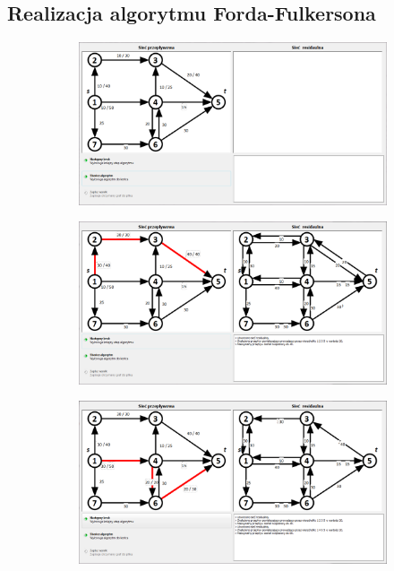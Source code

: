 \begin{appendices}
 	\chapter{Realizacja algorytmu Forda-Fulkersona}\label{add:C}
 	\setlength\intextsep{10pt}
 	\begin{figure}[H]
 		\centering
 		\begin{subfigure}{\textwidth}
 			\includegraphics[width=0.9\linewidth]{./img/spec_zew06_1.png}
 		\end{subfigure}\par\bigskip
 		\begin{subfigure}{\textwidth}
 			\includegraphics[width=0.9\linewidth]{./img/spec_zew06_2.png}
 		\end{subfigure}
 	\end{figure}
 	\begin{figure}[H]
 		\ContinuedFloat
 		\begin{subfigure}{\textwidth}
 			\includegraphics[width=0.9\linewidth]{./img/spec_zew06_3.png}

\end{subfigure}
\end{figure}
\end{appendices}
